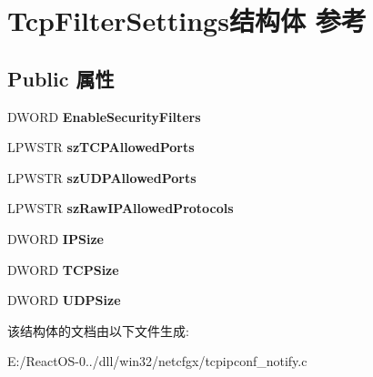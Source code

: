 \hypertarget{struct_tcp_filter_settings}{}\section{Tcp\+Filter\+Settings结构体 参考}
\label{struct_tcp_filter_settings}
\subsection*{Public 属性}
\begin{DoxyCompactItemize}
\item 
\mbox{\label{struct_tcp_filter_settings_a01b685e1ba0df9f5564d82c6487b23e9}} 
D\+W\+O\+RD {\bfseries Enable\+Security\+Filters}
\item 
\mbox{\label{struct_tcp_filter_settings_af9ab5ff702d6347b7fb4449114fdf637}} 
L\+P\+W\+S\+TR {\bfseries sz\+T\+C\+P\+Allowed\+Ports}
\item 
\mbox{\label{struct_tcp_filter_settings_aa54a25c2d959be3afbb7cfeb8d3387c6}} 
L\+P\+W\+S\+TR {\bfseries sz\+U\+D\+P\+Allowed\+Ports}
\item 
\mbox{\label{struct_tcp_filter_settings_ac6c899f9de11cba786973fdf64e03dd0}} 
L\+P\+W\+S\+TR {\bfseries sz\+Raw\+I\+P\+Allowed\+Protocols}
\item 
\mbox{\label{struct_tcp_filter_settings_a7afff48a25e99734b1b074a2821a0d1f}} 
D\+W\+O\+RD {\bfseries I\+P\+Size}
\item 
\mbox{\label{struct_tcp_filter_settings_af8051156b7514a1424cef16651e62c03}} 
D\+W\+O\+RD {\bfseries T\+C\+P\+Size}
\item 
\mbox{\label{struct_tcp_filter_settings_a4369c650293eb5c8392cc71f1048216c}} 
D\+W\+O\+RD {\bfseries U\+D\+P\+Size}
\end{DoxyCompactItemize}


该结构体的文档由以下文件生成\+:\begin{DoxyCompactItemize}
\item 
E\+:/\+React\+O\+S-\/0../dll/win32/netcfgx/tcpipconf\+\_\+notify.\+c\end{DoxyCompactItemize}
